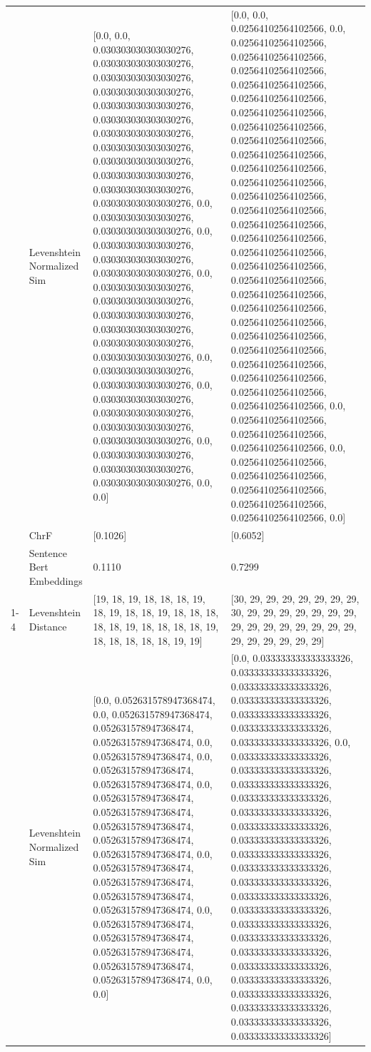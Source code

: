 \begin{tabular}{llll}
 & Levenshtein Normalized Sim & [0.0, 0.0, 0.030303030303030276, 0.030303030303030276, 0.030303030303030276, 0.030303030303030276, 0.030303030303030276, 0.030303030303030276, 0.030303030303030276, 0.030303030303030276, 0.030303030303030276, 0.030303030303030276, 0.030303030303030276, 0.030303030303030276, 0.0, 0.030303030303030276, 0.030303030303030276, 0.0, 0.030303030303030276, 0.030303030303030276, 0.030303030303030276, 0.0, 0.030303030303030276, 0.030303030303030276, 0.030303030303030276, 0.030303030303030276, 0.030303030303030276, 0.030303030303030276, 0.0, 0.030303030303030276, 0.030303030303030276, 0.0, 0.030303030303030276, 0.030303030303030276, 0.030303030303030276, 0.030303030303030276, 0.0, 0.030303030303030276, 0.030303030303030276, 0.030303030303030276, 0.0, 0.0] & [0.0, 0.0, 0.02564102564102566, 0.0, 0.02564102564102566, 0.02564102564102566, 0.02564102564102566, 0.02564102564102566, 0.02564102564102566, 0.02564102564102566, 0.02564102564102566, 0.02564102564102566, 0.02564102564102566, 0.02564102564102566, 0.02564102564102566, 0.02564102564102566, 0.02564102564102566, 0.02564102564102566, 0.02564102564102566, 0.02564102564102566, 0.02564102564102566, 0.02564102564102566, 0.02564102564102566, 0.02564102564102566, 0.02564102564102566, 0.02564102564102566, 0.02564102564102566, 0.02564102564102566, 0.02564102564102566, 0.02564102564102566, 0.02564102564102566, 0.0, 0.02564102564102566, 0.02564102564102566, 0.02564102564102566, 0.0, 0.02564102564102566, 0.02564102564102566, 0.02564102564102566, 0.02564102564102566, 0.02564102564102566, 0.0] \\
 & ChrF & [0.1026] & [0.6052] \\
 & Sentence Bert Embeddings & 0.1110 & 0.7299 \\
\cline{1-4}
\multirow[t]{4}{*}{Muhoreri ndari ngui} & Levenshtein Distance & [19, 18, 19, 18, 18, 18, 19, 18, 19, 18, 18, 19, 18, 18, 18, 18, 18, 19, 18, 18, 18, 18, 19, 18, 18, 18, 18, 18, 19, 19] & [30, 29, 29, 29, 29, 29, 29, 29, 30, 29, 29, 29, 29, 29, 29, 29, 29, 29, 29, 29, 29, 29, 29, 29, 29, 29, 29, 29, 29, 29] \\
 & Levenshtein Normalized Sim & [0.0, 0.052631578947368474, 0.0, 0.052631578947368474, 0.052631578947368474, 0.052631578947368474, 0.0, 0.052631578947368474, 0.0, 0.052631578947368474, 0.052631578947368474, 0.0, 0.052631578947368474, 0.052631578947368474, 0.052631578947368474, 0.052631578947368474, 0.052631578947368474, 0.0, 0.052631578947368474, 0.052631578947368474, 0.052631578947368474, 0.052631578947368474, 0.0, 0.052631578947368474, 0.052631578947368474, 0.052631578947368474, 0.052631578947368474, 0.052631578947368474, 0.0, 0.0] & [0.0, 0.033333333333333326, 0.033333333333333326, 0.033333333333333326, 0.033333333333333326, 0.033333333333333326, 0.033333333333333326, 0.033333333333333326, 0.0, 0.033333333333333326, 0.033333333333333326, 0.033333333333333326, 0.033333333333333326, 0.033333333333333326, 0.033333333333333326, 0.033333333333333326, 0.033333333333333326, 0.033333333333333326, 0.033333333333333326, 0.033333333333333326, 0.033333333333333326, 0.033333333333333326, 0.033333333333333326, 0.033333333333333326, 0.033333333333333326, 0.033333333333333326, 0.033333333333333326, 0.033333333333333326, 0.033333333333333326, 0.033333333333333326] \\

\end{tabular}
